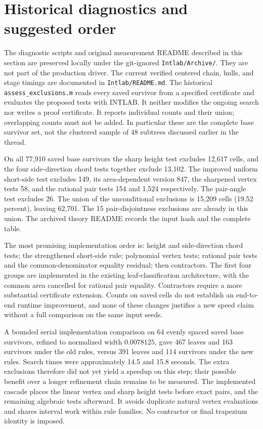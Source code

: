 \documentclass[11pt]{article}
\begin{document}
\section{Historical diagnostics and suggested order}
The diagnostic scripts and original measurement README described in this
section are preserved locally under the git-ignored \texttt{Intlab/Archive/}.
They are not part of the production driver. The current verified centered
chain, hulls, and stage timings are documented in \texttt{Intlab/README.md}.
The historical \texttt{assess\_exclusions.m} reads every saved survivor
from a specified certificate and evaluates the proposed tests with INTLAB.
It neither modifies the ongoing search nor writes a proof certificate.
It reports individual counts and their union; overlapping counts must not
be added. In particular these are the complete base survivor set, not the
clustered sample of 48 subtrees discussed earlier in the thread.

On all 77,910 saved base survivors the sharp height test excludes 12,617
cells, and the four side-direction chord tests together exclude 13,102.
The improved uniform short-side test excludes 149, its area-dependent version
847, the sharpened vertex tests 58, and the rational pair tests 154 and
1,524 respectively. The pair-angle test excludes 26. The union of the
unconditional exclusions is 15,209 cells (19.52 percent), leaving 62,701.
The 15 pair-disjointness exclusions are already in this union.
The archived theory README records the input hash and the complete table.

The most promising implementation order is: height and side-direction chord
tests; the strengthened short-side rule; polynomial vertex tests; rational
pair tests and the common-denominator equality residual; then contractors.
The first four groups are implemented in the existing leaf-classification
architecture, with the common area cancelled for rational pair equality.
Contractors require a more substantial certificate extension.
Counts on saved cells do not establish an end-to-end runtime improvement,
and none of these changes justifies a new speed claim without a full
comparison on the same input seeds.

A bounded serial implementation comparison on 64 evenly spaced saved base
survivors, refined to normalized width $0.0078125$, gave 467 leaves and
163 survivors under the old rules, versus 391 leaves and 114 survivors under
the new rules. Search times were approximately 14.5 and 15.8 seconds.
The extra exclusions therefore did not yet yield a speedup on this step;
their possible benefit over a longer refinement chain remains to be measured.
The implemented cascade places the linear vertex and sharp height tests
before exact pairs, and the remaining algebraic tests afterward. It avoids
duplicate natural vertex evaluations and shares interval work within rule
families. No contractor or final trapezium identity is imposed.
\end{document}
